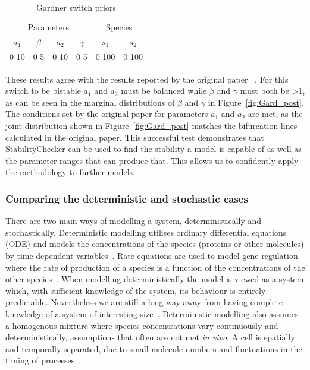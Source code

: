 \begin{table}[b]
\centering
\caption{Gardner switch priors}
\label{tab:gard}
\begin{tabular}{cccc|cc}
\multicolumn{4}{c|}{Parameters} & \multicolumn{2}{c}{Species} \\ %
$a_1$   & $\beta$   & $a_2$   & $\gamma$  &   $s_1$      &       $s_2$   \\
0-10    & 0-5       & 0-10    &  0-5      &      0-100   &          0-100   
\end{tabular}
\end{table}

These results agree with the results reported by the original paper~\autocite{Gardner:2000vha} . For this switch to be bistable $a_1$ and $a_2$ must be balanced while $\beta$ and $\gamma$ must both be \textgreater 1, as can be seen in the marginal distributions of $\beta$ and $\gamma$ in Figure~\ref{fig:Gard_post}. The conditions set by the original paper for parameters $a_1$ and $a_2$ are met, as the joint distribution shown in Figure~\ref{fig:Gard_post} matches the bifurcation lines calculated in the original paper. 
This successful test demonstrates that StabilityChecker can be used to find the stability a model is capable of as well as the parameter ranges that can produce that. This allows us to confidently apply the methodology to further models.

\subsubsection{Comparing the deterministic and stochastic cases} 
    
There are two main ways of modelling a system, deterministically and stochastically. Deterministic modelling utilises ordinary differential equations (ODE) and models the concentrations of the species (proteins or other molecules) by time-dependent variables~\autocite{deJong:2002ft}. Rate equations are used to model gene regulation where the rate of production of a species is a function of the concentrations of the other species~\autocite{deJong:2002ft}. When modelling deterministically the model is viewed as a system which, with sufficient knowledge of the system, its behaviour is entirely predictable. Nevertheless we are still a long way away from having complete knowledge of a system of interesting size~\autocite{wilkinson:2006}. Deterministic modelling also assumes a homogenous mixture where species concentrations vary continuously and deterministically, assumptions that often are not met \textit{in vivo}. A cell is spatially and temporally separated, due to small molecule numbers and fluctuations in the timing of processes~\autocite{deJong:2002ft}.  
   
